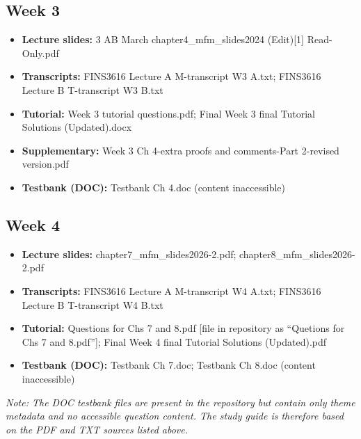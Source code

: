 \documentclass[11pt,a4paper]{article}
\begin{document}
{\subsection*{Week 3}
\begin{itemize}
  \item \textbf{Lecture slides:} 3 AB March chapter4\_mfm\_slides2024 (Edit)[1] Read-Only.pdf
  \item \textbf{Transcripts:} FINS3616 Lecture A M-transcript W3 A.txt; FINS3616 Lecture B T-transcript W3 B.txt
  \item \textbf{Tutorial:} Week 3 tutorial questions.pdf; Final Week 3 final Tutorial Solutions (Updated).docx
  \item \textbf{Supplementary:} Week 3 Ch 4-extra proofs and comments-Part 2-revised version.pdf
  \item \textbf{Testbank (DOC):} Testbank Ch 4.doc (content inaccessible)
\end{itemize}

\subsection*{Week 4}
\begin{itemize}
  \item \textbf{Lecture slides:} chapter7\_mfm\_slides2026-2.pdf; chapter8\_mfm\_slides2026-2.pdf
  \item \textbf{Transcripts:} FINS3616 Lecture A M-transcript W4 A.txt; FINS3616 Lecture B T-transcript W4 B.txt
  \item \textbf{Tutorial:} Questions for Chs 7 and 8.pdf [file in repository as ``Quetions for Chs 7 and 8.pdf'']; Final Week 4 final Tutorial Solutions (Updated).pdf
  \item \textbf{Testbank (DOC):} Testbank Ch 7.doc; Testbank Ch 8.doc (content inaccessible)
\end{itemize}

\vspace{0.5cm}
\noindent\textit{Note: The DOC testbank files are present in the repository but contain only theme metadata and no accessible question content. The study guide is therefore based on the PDF and TXT sources listed above.}

} %
\end{document}
